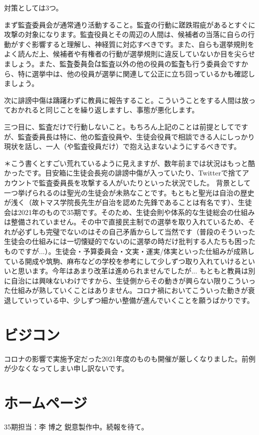 \documentclass[a4paper]{ltjsreport}
\begin{document}
対策としては3つ。

まず監査委員会が通常通り活動すること。監査の行動に蹉跌瑕疵があるとすぐに攻撃の対象になります。監査役員とその周辺の人間は、候補者の当落に自らの行動がすぐ影響すると理解し、神経質に対応すべきです。また、自らも選挙規則をよく読んだ上、候補者や有権者の行動が選挙規則に違反していないか目を尖らせましょう。また、\.監\.査\.委\.員\.会は監査以外の他の役員の\.監\.査も行う委員会ですから、特に選挙中は、他の役員が選挙に関連して公正に立ち回っているかも確認しましょう。

次に誹謗中傷は躊躇わずに教員に報告すること。こういうことをする人間は放っておかれると同じことを繰り返しますし、事態が悪化します。

三つ目に、監査だけで行動しないこと。もちろん上記のことは前提としてですが、監査委員長は特に、他の監査役員や、生徒会役員で相談できる人にしっかり現状を話し、一人（や監査役員だけ）で抱え込まないようにするべきです。

＊こう書くとすごい荒れているように見えますが、数年前までは状況はもっと酷かったです。目安箱に生徒会長宛の誹謗中傷が入っていたり、Twitterで捨てアカウントで監査委員長を攻撃する人がいたりといった状況でした。
背景として一つ挙げられるのは聖光の生徒会が未熟なことです。もともと聖光は自治の歴史が浅く（故トマス学院長先生が自治を認めた先鋒であることは有名です）、生徒会は2021年のもので35期です。そのため、生徒会則や体系的な生徒総会の仕組みは整備されていません。その中で直接民主制での選挙を取り入れているため、それが必ずしも完璧でないのはその自己矛盾からして当然です（普段のそういった生徒会の仕組みには一切懐疑的でないのに選挙の時だけ批判する人たちも困ったものですが...）。生徒会・予算委員会・文実・運実/体実といった仕組みが成熟している開成や筑駒、麻布などの学校を参考にして少しずつ取り入れていけるといいと思います。今年はあまり改革は進められませんでしたが... もともと教員は別に自治には興味ないわけですから、生徒側からその動きが興らない限りこういった仕組みが熟していくことはありません。コロナ禍においてこういった動きが衰退していっている中、少しずつ細かい整備が進んでいくことを願うばかりです。

\section{ビジコン}
コロナの影響で実施予定だった2021年度のものも開催が厳しくなりました。前例が少なくなってしまい申し訳ないです。
\section{ホームページ}
35期担当：李 博之\vspace{3mm}
鋭意製作中。続報を待て。
\end{document}
